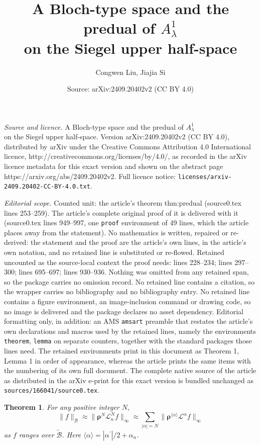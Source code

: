 \documentclass[10pt,a4paper]{amsart}
\title{A Bloch-type space and the predual of $A_\lambda^1$\\ on the Siegel upper half-space}
\author{Congwen Liu, Jiajia Si}
\date{Source: arXiv:2409.20402v2 (CC BY 4.0)}
\newtheorem{theorem}{Theorem}
\newcommand{\bfL}{\mathcal{L}}
\newcommand{\bfrho}{\boldsymbol{\rho}}
\newcommand{\calB}{\mathcal{B}}
\begin{document}
\maketitle

\noindent\emph{Source and licence.} A Bloch-type space and the predual of $A_\lambda^1$\\ on the Siegel upper half-space. Version arXiv:2409.20402v2 (CC BY 4.0), distributed by arXiv under the Creative Commons Attribution 4.0 International licence, http://creativecommons.org/licenses/by/4.0/, as recorded in the arXiv licence metadata for this exact version and shown on the abstract page https://arxiv.org/abs/2409.20402v2. Full licence notice: \texttt{licenses/arxiv-2409.20402-CC-BY-4.0.txt}.\par\smallskip

\noindent\textit{Editorial scope.} Counted unit: the article's theorem thm:predual (source0.tex lines 253--259). The article's complete original proof of it is delivered with it (source0.tex lines 949--997, one \texttt{proof} environment of 49 lines, which the article places away from the statement). No mathematics is written, repaired or re-derived: the statement and the proof are the article's own lines, in the article's own notation, and no retained line is substituted or re-flowed.  Retained uncounted as the source-local context the proof needs: lines 228--234; lines 297--300; lines 695--697; lines 930--936.  Nothing was omitted from any retained span, so the package carries no omission record.  No retained line contains a citation, so the wrapper carries no bibliography and no bibliography entry.  No retained line contains a figure environment, an image-inclusion command or drawing code, so no image is delivered and the package declares no asset dependency.  Editorial formatting only, in addition: an AMS \texttt{amsart} preamble that restates the article's own declarations and macros used by the retained lines, namely the environments \texttt{theorem}, \texttt{lemma} on separate counters, together with the standard packages those lines need.  The retained environments print in this document as Theorem 1, Lemma 1 in order of appearance, whereas the article prints the same items with the numbering of its own full document.  The complete native source of the article as distributed in the arXiv e-print for this exact version is bundled unchanged as \texttt{sources/166041/source0.tex}.
\begin{theorem}\label{thm:bloch norm equiv}
For any positive integer $N$,
\[
\|f\|_{\calB} \approx \|\bfrho^N \bfL_n^N f\|_{\infty} \approx \sum_{|\alpha | = N} \| \bfrho^{\langle \alpha \rangle} \bfL^{\alpha} f\|_{\infty}
\]
as $f$ ranges over $\widetilde{\calB}$. Here $\langle \alpha \rangle=|\alpha^{\prime}|/2+\alpha_n$. 
\end{theorem}
\end{document}
